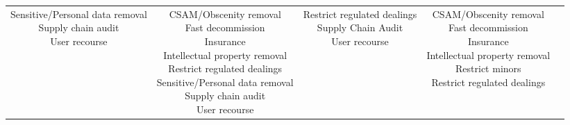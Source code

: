 \documentclass[fleqn]{article}
\begin{document}
\begin{landscape}
\begin{table}[H]
\begin{tabular}{|c|c|c|c|c|}
{			\textbullet\hspace{3pt} Sensitive/Personal data removal \\ 	
			\textbullet\hspace{3pt} Supply chain audit \\ 	
			\textbullet\hspace{3pt} User recourse \\ 		 	
		}
		& \makecell[l]{
			\textbullet\hspace{3pt} CSAM/Obscenity removal \\ 	
			\textbullet\hspace{3pt} Fast decommission \\ 	
			\textbullet\hspace{3pt} Insurance \\ 	
			\textbullet\hspace{3pt} Intellectual property removal \\ 	
			\textbullet\hspace{3pt} Restrict regulated dealings \\ 	
			\textbullet\hspace{3pt} Sensitive/Personal data removal \\ 	
			\textbullet\hspace{3pt} Supply chain audit \\ 	
			\textbullet\hspace{3pt} User recourse \\   
		}
		& \makecell[l]{	
			\textbullet\hspace{3pt} Restrict regulated dealings \\ 		
			\textbullet\hspace{3pt} Supply Chain Audit \\ 	
			\textbullet\hspace{3pt} User recourse \\  
		}
		& \makecell[l]{
			\textbullet\hspace{3pt} CSAM/Obscenity removal \\ 	
			\textbullet\hspace{3pt} Fast decommission \\ 	
			\textbullet\hspace{3pt} Insurance \\ 	
			\textbullet\hspace{3pt} Intellectual property removal \\ 		
			\textbullet\hspace{3pt} Restrict minors \\ 	
			\textbullet\hspace{3pt} Restrict regulated dealings \\ 	
}
\end{tabular}
\end{table}
\end{landscape}
\end{document}

